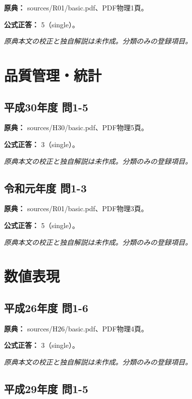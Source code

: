 \noindent\textbf{原典：} sources/R01/basic.pdf、PDF物理1頁。

\textbf{公式正答：} 5（single）。

\par\textit{原典本文の校正と独自解説は未作成。分類のみの登録項目。}

\section{品質管理・統計}

\subsection{平成30年度 問1-5}
\label{q:h30-reg-basic-1-5}

\noindent\textbf{原典：} sources/H30/basic.pdf、PDF物理5頁。

\textbf{公式正答：} 3（single）。

\par\textit{原典本文の校正と独自解説は未作成。分類のみの登録項目。}

\subsection{令和元年度 問1-3}
\label{q:r01-reg-basic-1-3}

\noindent\textbf{原典：} sources/R01/basic.pdf、PDF物理3頁。

\textbf{公式正答：} 5（single）。

\par\textit{原典本文の校正と独自解説は未作成。分類のみの登録項目。}

\section{数値表現}

\subsection{平成26年度 問1-6}
\label{q:h26-reg-basic-1-6}

\noindent\textbf{原典：} sources/H26/basic.pdf、PDF物理4頁。

\textbf{公式正答：} 3（single）。

\par\textit{原典本文の校正と独自解説は未作成。分類のみの登録項目。}

\subsection{平成29年度 問1-5}
\label{q:h29-reg-basic-1-5}

